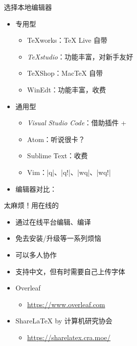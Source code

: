 \begin{frame}[fragile]{选择本地编辑器}
	\begin{itemize}
		\item<+-> 专用型
		      \begin{itemize}
			      \item TeXworks：\TeX{} Live 自带 \faWindows{} \faApple{} \faLinux{}
			      \item \emph{TeXstudio}：功能丰富，对新手友好 \faWindows{} \faApple{} \faLinux{}
			      \item TeXShop：Mac\TeX{} 自带 \faApple{}
			      \item WinEdt：功能丰富，收费 \faWindows{}
		      \end{itemize}

		\item<+-> 通用型

		      \begin{itemize}
			      \item \emph{Visual Studio Code}：借助插件   + 
			      \item Atom：听说很卡？
			      \item Sublime Text：收费
			      \item Vim：|q|、|q!|、|wq|、|wq!|
		      \end{itemize}

		\item<+-> 编辑器对比：
	\end{itemize}
\end{frame}


\begin{frame}[fragile]{太麻烦！用在线的}

	\begin{itemize}
		\item 通过在线平台编辑、编译
		\item 免去安装/升级等一系列烦恼
		\item 可以多人协作
		\item 支持中文，但有时需要自己上传字体
	\end{itemize}

	\begin{itemize}
		\item Overleaf
		      \begin{itemize}
			      \item \url{https://www.overleaf.com}
		      \end{itemize}
		\item ShareLaTeX by 计算机研究协会
		      \begin{itemize}
			      \item \url{https://sharelatex.cra.moe/}
		      \end{itemize}
	\end{itemize}
\end{frame}

